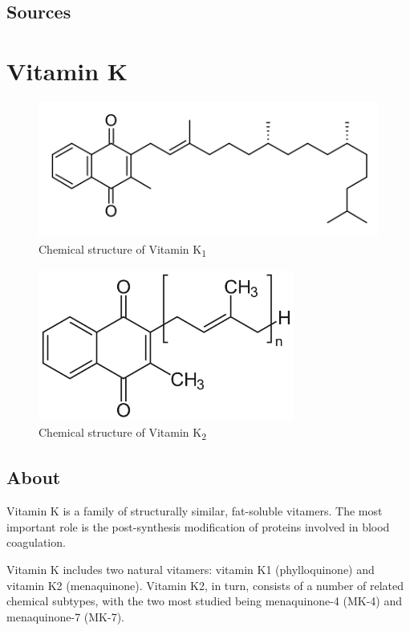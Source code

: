 \documentclass{book}
\begin{document}
\begin{sloppypar}
\section{Sources}


\chapter{Vitamin K}
\begin{figure}[h]
	\caption{Chemical structure of Vitamin K\textsubscript{1}}
	\centering \includegraphics[width=\textwidth]{images/Vitamin_K1_chemical_structure}
\end{figure}
\begin{figure}[h]
	\caption{Chemical structure of Vitamin K\textsubscript{2}}
	\centering \includegraphics[width=0.75\textwidth]{images/Vitamin_K2_chemical_structure}
\end{figure}
\newpage

\section{About}
Vitamin K is a family of structurally similar, fat-soluble vitamers.
The most important role is the post-synthesis modification of proteins involved in blood coagulation.

Vitamin K includes two natural vitamers: vitamin K1 (phylloquinone) and vitamin K2 (menaquinone).
Vitamin K2, in turn, consists of a number of related chemical subtypes, with the two most studied being menaquinone-4 (MK-4) and menaquinone-7 (MK-7).


\end{sloppypar}
\end{document}
